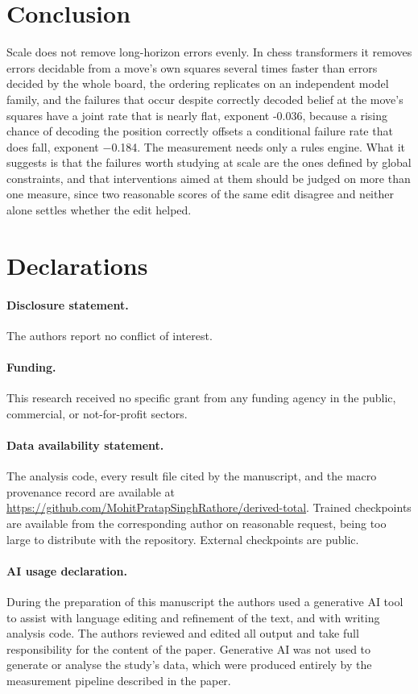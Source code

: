\documentclass[11pt]{article}
\begin{document}
\section{Conclusion}

Scale does not remove long-horizon errors evenly. In chess transformers it removes
errors decidable from a move's own squares several times faster than errors
decided by the whole board, the ordering replicates on an independent model family,
and the failures that occur despite correctly decoded belief at the move's squares
have a joint rate that is nearly flat, exponent -0.036, because a rising chance
of decoding the position correctly offsets a conditional failure rate that does fall,
exponent $-$0.184. The measurement needs only a rules engine. What it suggests is
that the failures worth studying at scale are the ones defined by global constraints,
and that interventions aimed at them should be judged on more than one measure, since
two reasonable scores of the same edit disagree and neither alone settles whether the
edit helped.

\section*{Declarations}

\paragraph{Disclosure statement.}
 The authors report no conflict of interest. 

\paragraph{Funding.}
 This research received no specific grant from any funding agency in the
public, commercial, or not-for-profit sectors. 

\paragraph{Data availability statement.}

The analysis code, every result file cited by the manuscript, and the macro
provenance record are available at
\url{https://github.com/MohitPratapSinghRathore/derived-total}. Trained checkpoints
are available from the corresponding author on reasonable request, being too large
to distribute with the repository. External checkpoints are public.


\paragraph{AI usage declaration.}
During the preparation of this manuscript the authors used a generative AI tool to
assist with language editing and refinement of the text, and with writing analysis
code. The authors reviewed and edited all output and take full responsibility for
the content of the paper. Generative AI was not used to generate or analyse the
study's data, which were produced entirely by the measurement pipeline described in
the paper.
\end{document}
